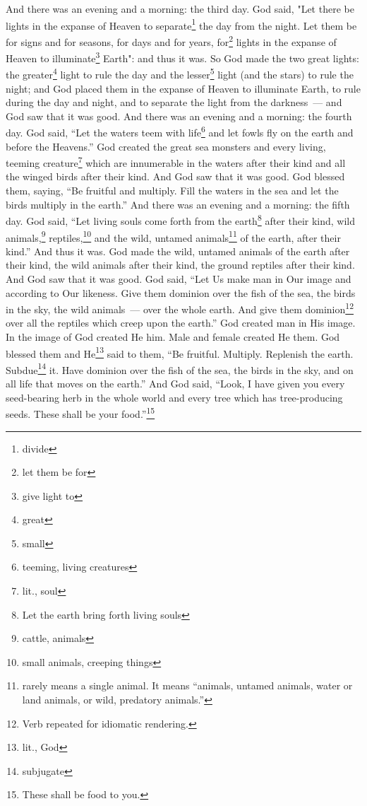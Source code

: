 \begin{enumerate}[align=center]
     And there was an evening and a morning: the third day.%
     God said, "Let there be lights in the expanse of Heaven to separate\footnote{divide} the day from the night. Let them be for signs and for seasons, for days and for years,%
     for\footnote{let them be for} lights in the expanse of Heaven to illuminate\footnote{give light to} Earth": and thus it was.%
     So God made the two great lights: the greater\footnote{great} light to rule the day and the lesser\footnote{small} light (and the stars) to rule the night;%
     and God placed them in the expanse of Heaven to illuminate Earth,%
     to rule during the day and night, and to separate the light from the darkness~--- and God saw that it was good.%
     And there was an evening and a morning: the fourth day.%
     God said, ``Let the waters teem with life\footnote{teeming, living creatures} and let fowls fly on the earth and before the Heavens.''%
     God created the great sea monsters and every living, teeming creature\footnote{lit., soul} which are innumerable in the waters after their kind and all the winged birds after their kind. And God saw that it was good.%
     God blessed them, saying, ``Be fruitful and multiply. Fill the waters in the sea and let the birds multiply in the earth.''%
     And there was an evening and a morning: the fifth day.%
     God said, ``Let living souls come forth from the earth\footnote{Let the earth bring forth living souls} after their kind, wild animals,\footnote{cattle, animals} reptiles,\footnote{small animals, creeping things} and the wild, untamed animals\footnote{ rarely means a single animal. It means ``animals, untamed animals, water or land animals, or wild, predatory animals.''} of the earth, after their kind.'' And thus it was.%
     God made the wild, untamed animals of the earth after their kind, the wild animals after their kind, the ground reptiles after their kind. And God saw that it was good.%
     God said, ``Let Us make man in Our image and according to Our likeness. Give them dominion over the fish of the sea, the birds in the sky, the wild animals~--- over the whole earth. And give them dominion\footnote{Verb repeated for idiomatic rendering.} over all the reptiles which creep upon the earth.''%
     God created man in His image. In the image of God created He him. Male and female created He them.%
     God blessed them and He\footnote{lit., God} said to them, ``Be fruitful. Multiply. Replenish the earth. Subdue\footnote{subjugate} it. Have dominion over the fish of the sea, the birds in the sky, and on all life that moves on the earth.''%
     And God said, ``Look, I have given you every seed-bearing herb in the whole world and every tree which has tree-producing seeds. These shall be your food.''\footnote{These shall be food to you.}%
\end{enumerate}
